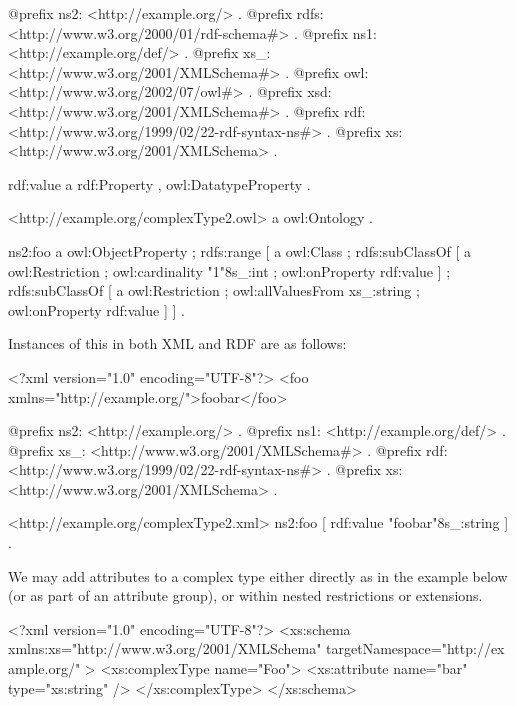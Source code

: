 \begin{DoxyCodeInclude}
@prefix ns2:     <http://example.org/> .
@prefix rdfs:    <http://www.w3.org/2000/01/rdf-schema#> .
@prefix ns1:     <http://example.org/def/> .
@prefix xs_:     <http://www.w3.org/2001/XMLSchema#> .
@prefix owl:     <http://www.w3.org/2002/07/owl#> .
@prefix xsd:     <http://www.w3.org/2001/XMLSchema#> .
@prefix rdf:     <http://www.w3.org/1999/02/22-rdf-syntax-ns#> .
@prefix xs:      <http://www.w3.org/2001/XMLSchema> .

rdf:value
      a       rdf:Property , owl:DatatypeProperty .

<http://example.org/complexType2.owl>
      a       owl:Ontology .

ns2:foo
      a       owl:ObjectProperty ;
      rdfs:range
              [ a       owl:Class ;
                rdfs:subClassOf
                        [ a       owl:Restriction ;
                          owl:cardinality "1"^^xs_:int ;
                          owl:onProperty rdf:value
                        ] ;
                rdfs:subClassOf
                        [ a       owl:Restriction ;
                          owl:allValuesFrom xs_:string ;
                          owl:onProperty rdf:value
                        ]
              ] .
\end{DoxyCodeInclude}


Instances of this in both XML and RDF are as follows:


\begin{DoxyCodeInclude}
<?xml version="1.0" encoding="UTF-8"?>
<foo xmlns="http://example.org/">foobar</foo>
\end{DoxyCodeInclude}
 
\begin{DoxyCodeInclude}
@prefix ns2:     <http://example.org/> .
@prefix ns1:     <http://example.org/def/> .
@prefix xs_:     <http://www.w3.org/2001/XMLSchema#> .
@prefix rdf:     <http://www.w3.org/1999/02/22-rdf-syntax-ns#> .
@prefix xs:      <http://www.w3.org/2001/XMLSchema> .

<http://example.org/complexType2.xml>
      ns2:foo [ rdf:value "foobar"^^xs_:string
              ] .
\end{DoxyCodeInclude}


We may add attributes to a complex type either directly as in the example below (or as part of an attribute group), or within nested restrictions or extensions.


\begin{DoxyCodeInclude}
<?xml version="1.0" encoding="UTF-8"?>
<xs:schema xmlns:xs="http://www.w3.org/2001/XMLSchema" targetNamespace="http://ex
      ample.org/" >
        <xs:complexType name="Foo">
                <xs:attribute name="bar" type="xs:string" />
        </xs:complexType>
</xs:schema>
\end{DoxyCodeInclude}


